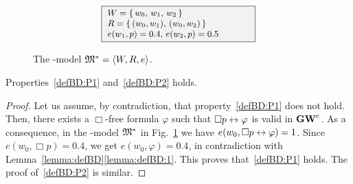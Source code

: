 \begin{figure}[h]
  \centering
  \begin{minipage}{0.45\linewidth}
  \end{minipage}
  \begin{minipage}{0.5\linewidth}
    \[\small
    \begin{array}{l}
      \fcolorbox{black}{gray!10}{
        \begin{minipage}{16em}\small
          $W=\{\,w_0,\,w_1,\,w_2\,\}$
          \\
          $R =\{\,(w_0,w_1),\,(w_0,w_2)\,\}$
          \\
          $e(w_1,p) = 0.4,\,e(w_2,p) = 0.5$  
        \end{minipage}
      } %
    \end{array}
    \]
  \end{minipage}
  \caption{The \GWCM-model  $\mathfrak{M}^\ast=\langle W,R,e \rangle$.}
  \label{fig:ind}
\end{figure}
  


\begin{proposition}\label{prop:gwclBD}
  Properties~\ref{defBD:P1} and~\ref{defBD:P2} holds.
\end{proposition}  

\begin{proof}
  Let us assume, by contradiction, that property~\ref{defBD:P1} does
  not hold.  Then, there exists a $\Box$-free formula $\varphi$ such
  that $\Box p \leftrightarrow\varphi$ is valid in $\mathbf{GW}^\mathrm{c}$. As a consequence, in
  the \GWCM-model $\mathfrak{M}^\ast$ in Fig.~\ref{fig:ind} we have $e(w_0, \Box
  p \leftrightarrow\varphi)=1$. Since $e(w_0, \Box p)= 0.4$, we get $e(w_0,
  \varphi)= 0.4$, in contradiction with
  Lemma~\ref{lemma:defBD}\ref{lemma:defBD:1}.  This proves
  that~\ref{defBD:P1} holds. The proof of~\ref{defBD:P2} is similar.
\end{proof}


